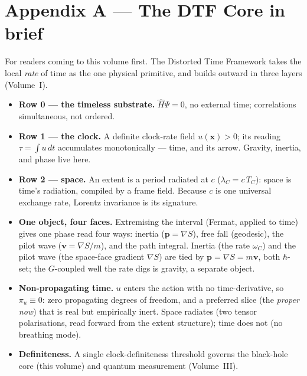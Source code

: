 \documentclass[11pt]{article}
\begin{document}
\section*{Appendix A --- The DTF Core in brief}
\noindent For readers coming to this volume first. The Distorted Time Framework takes the local
\emph{rate} of time as the one physical primitive, and builds outward in three layers (Volume~I).
\begin{itemize}[leftmargin=1.4em,itemsep=3pt,topsep=3pt]
  \item \textbf{Row 0 --- the timeless substrate.} $\hat H\Psi=0$, no external time; correlations
    simultaneous, not ordered.
  \item \textbf{Row 1 --- the clock.} A definite clock-rate field $u(\mathbf x)>0$; its reading
    $\tau=\int u\,dt$ accumulates monotonically --- time, and its arrow. Gravity, inertia, and phase live
    here.
  \item \textbf{Row 2 --- space.} An extent is a period radiated at $c$ ($\lambda_C=c\,T_C$): space is
    time's radiation, compiled by a frame field. Because $c$ is one universal exchange rate, Lorentz
    invariance is its signature.
  \item \textbf{One object, four faces.} Extremising the interval (Fermat, applied to time) gives one
    phase read four ways: inertia ($\mathbf p=\nabla S$), free fall (geodesic), the pilot wave
    ($\mathbf v=\nabla S/m$), and the path integral. Inertia (the rate $\omega_C$) and the pilot wave (the
    space-face gradient $\nabla S$) are tied by $\mathbf p=\nabla S=m\mathbf v$, both $\hbar$-set; the
    $G$-coupled well the rate digs is gravity, a separate object.
  \item \textbf{Non-propagating time.} $u$ enters the action with no time-derivative, so $\pi_u\equiv0$:
    zero propagating degrees of freedom, and a preferred slice (the \emph{proper now}) that is real but
    empirically inert. Space radiates (two tensor polarisations, read forward from the extent structure); time does not (no breathing mode).
  \item \textbf{Definiteness.} A single clock-definiteness threshold governs the black-hole core (this
    volume) and quantum measurement (Volume~III).
\end{itemize}
\end{document}
